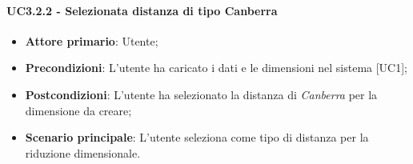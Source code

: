 \paragraph{UC3.2.2 - Selezionata distanza di tipo Canberra}
\begin{itemize}
	\item \textbf{Attore primario}: Utente;
	\item \textbf{Precondizioni}: L'utente ha caricato i dati e le dimensioni nel sistema [UC1];
	\item \textbf{Postcondizioni}: L'utente ha selezionato la distanza di \textit{Canberra} per la dimensione da creare;
	\item \textbf{Scenario principale}: L'utente seleziona  come tipo di distanza per la riduzione dimensionale.

\end{itemize}